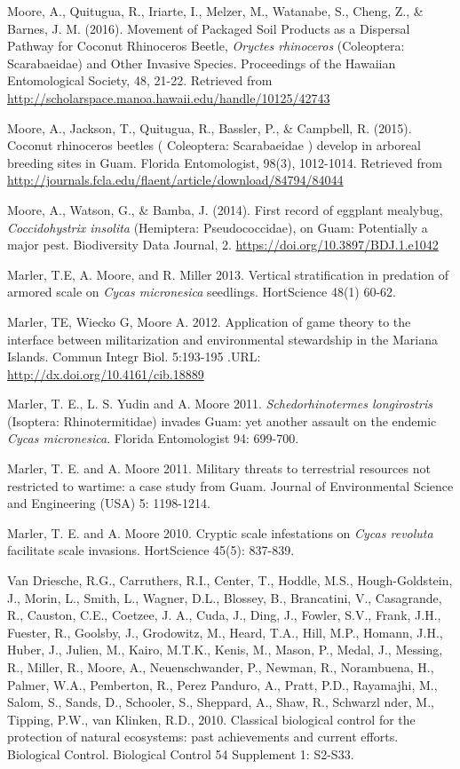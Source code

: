 \documentclass[12pt,english]{simplecv}
\begin{document}
\begin{thebibliography}{10}
\bibitem{} Moore, A., Quitugua, R., Iriarte, I., Melzer, M., Watanabe, S., Cheng, Z., \& Barnes, J. M. (2016). Movement of Packaged Soil Products as a Dispersal Pathway for Coconut Rhinoceros Beetle, \textit{Oryctes rhinoceros} (Coleoptera: Scarabaeidae) and Other Invasive Species. Proceedings of the Hawaiian Entomological Society, 48, 21-22. Retrieved from \url{http://scholarspace.manoa.hawaii.edu/handle/10125/42743}

\bibitem{} Moore, A., Jackson, T., Quitugua, R., Bassler, P., \& Campbell, R. (2015). Coconut rhinoceros beetles ( Coleoptera: Scarabaeidae ) develop in arboreal breeding sites in Guam. Florida Entomologist, 98(3), 1012-1014. Retrieved from \url{http://journals.fcla.edu/flaent/article/download/84794/84044}

\bibitem{} Moore, A., Watson, G., \& Bamba, J. (2014). First record of eggplant mealybug, \textit{Coccidohystrix insolita} (Hemiptera: Pseudococcidae), on Guam: Potentially a major pest. Biodiversity Data Journal, 2. \url{https://doi.org/10.3897/BDJ.1.e1042}

Marler, T.E, A. Moore, and R. Miller 2013. Vertical
stratification in predation of armored scale on \emph{Cycas micronesica}
seedlings. HortScience 48(1) 60-62.

Marler, TE, Wiecko G, Moore A. 2012. Application
of game theory to the interface between militarization and environmental
stewardship in the Mariana Islands. Commun Integr Biol. 5:193-195
.URL: \url{http://dx.doi.org/10.4161/cib.18889}

Marler, T. E., L. S. Yudin and A. Moore 2011. \emph{Schedorhinotermes
longirostris} (Isoptera: Rhinotermitidae) invades Guam: yet another
assault on the endemic \emph{Cycas micronesica}. Florida Entomologist
94: 699-700.

Marler, T. E. and A. Moore 2011. Military threats
to terrestrial resources not restricted to wartime: a case study from
Guam. Journal of Environmental Science and Engineering (USA) 5: 1198-1214.

Marler, T. E. and A. Moore 2010. Cryptic scale infestations
on \emph{Cycas revoluta} facilitate scale invasions. HortScience 45(5):
837-839.

Van Driesche, R.G., Carruthers, R.I., Center, T.,
Hoddle, M.S., Hough-Goldstein, J., Morin, L., Smith, L., Wagner, D.L.,
Blossey, B., Brancatini, V., Casagrande, R., Causton, C.E., Coetzee,
J. A., Cuda, J., Ding, J., Fowler, S.V., Frank, J.H., Fuester, R.,
Goolsby, J., Grodowitz, M., Heard, T.A., Hill, M.P., Homann, J.H.,
Huber, J., Julien, M., Kairo, M.T.K., Kenis, M., Mason, P., Medal,
J., Messing, R., Miller, R., Moore, A., Neuenschwander, P., Newman,
R., Norambuena, H., Palmer, W.A., Pemberton, R., Perez Panduro, A.,
Pratt, P.D., Rayamajhi, M., Salom, S., Sands, D., Schooler, S., Sheppard,
A., Shaw, R., Schwarzl nder, M., Tipping, P.W., van Klinken, R.D.,
2010. Classical biological control for the protection of natural ecosystems:
past achievements and current efforts. Biological Control. Biological
Control 54 Supplement 1: S2-S33.


\end{thebibliography}
\end{document}
